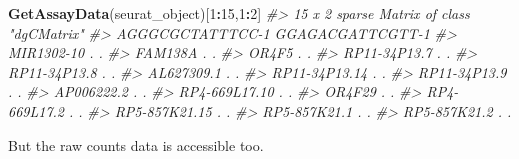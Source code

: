 \documentclass[
]{book}
\newenvironment{Shaded}{\begin{snugshade}}{\end{snugshade}}
\newcommand{\CommentTok}[1]{\textcolor[rgb]{0.56,0.35,0.01}{\textit{#1}}}
\newcommand{\DecValTok}[1]{\textcolor[rgb]{0.00,0.00,0.81}{#1}}
\newcommand{\FunctionTok}[1]{\textcolor[rgb]{0.13,0.29,0.53}{\textbf{#1}}}
\newcommand{\NormalTok}[1]{#1}
\newcommand{\SpecialCharTok}[1]{\textcolor[rgb]{0.81,0.36,0.00}{\textbf{#1}}}
\begin{document}
\begin{Shaded}
\begin{Highlighting}[]
\FunctionTok{GetAssayData}\NormalTok{(seurat\_object)[}\DecValTok{1}\SpecialCharTok{:}\DecValTok{15}\NormalTok{,}\DecValTok{1}\SpecialCharTok{:}\DecValTok{2}\NormalTok{]}
\CommentTok{\#\textgreater{} 15 x 2 sparse Matrix of class "dgCMatrix"}
\CommentTok{\#\textgreater{}               AGGGCGCTATTTCC{-}1 GGAGACGATTCGTT{-}1}
\CommentTok{\#\textgreater{} MIR1302{-}10                   .                .}
\CommentTok{\#\textgreater{} FAM138A                      .                .}
\CommentTok{\#\textgreater{} OR4F5                        .                .}
\CommentTok{\#\textgreater{} RP11{-}34P13.7                 .                .}
\CommentTok{\#\textgreater{} RP11{-}34P13.8                 .                .}
\CommentTok{\#\textgreater{} AL627309.1                   .                .}
\CommentTok{\#\textgreater{} RP11{-}34P13.14                .                .}
\CommentTok{\#\textgreater{} RP11{-}34P13.9                 .                .}
\CommentTok{\#\textgreater{} AP006222.2                   .                .}
\CommentTok{\#\textgreater{} RP4{-}669L17.10                .                .}
\CommentTok{\#\textgreater{} OR4F29                       .                .}
\CommentTok{\#\textgreater{} RP4{-}669L17.2                 .                .}
\CommentTok{\#\textgreater{} RP5{-}857K21.15                .                .}
\CommentTok{\#\textgreater{} RP5{-}857K21.1                 .                .}
\CommentTok{\#\textgreater{} RP5{-}857K21.2                 .                .}
\end{Highlighting}
\end{Shaded}

But the raw counts data is accessible too.
\end{document}
